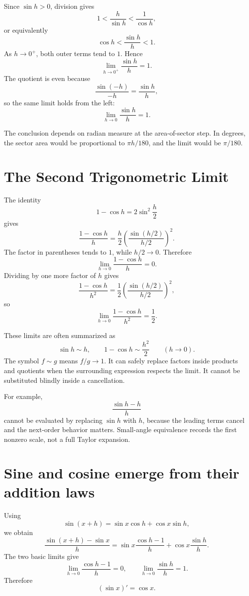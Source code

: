 Since \(\sin h>0\), division gives
\[
  1<\frac{h}{\sin h}<\frac1{\cos h},
\]
or equivalently
\[
  \cos h<\frac{\sin h}{h}<1.
\]
As \(h\to0^+\), both outer terms tend to \(1\).  Hence
\[
  \lim_{h\to0^+}\frac{\sin h}{h}=1.
\]
The quotient is even because
\[
  \frac{\sin(-h)}{-h}=\frac{\sin h}{h},
\]
so the same limit holds from the left:
\[
  \boxed{\displaystyle
  \lim_{h\to0}\frac{\sin h}{h}=1.}
\]

The conclusion depends on radian measure at the area-of-sector step.  In degrees, the sector area would be proportional to \(\pi h/180\), and the limit would be \(\pi/180\).

\section{The Second Trigonometric Limit}

The identity
\[
  1-\cos h=2\sin^2\frac h2
\]
gives
\[
  \frac{1-\cos h}{h}
  =\frac h2
   \left(
     \frac{\sin(h/2)}{h/2}
   \right)^2.
\]
The factor in parentheses tends to \(1\), while \(h/2\to0\).  Therefore
\[
  \boxed{\displaystyle
  \lim_{h\to0}\frac{1-\cos h}{h}=0.}
\]
Dividing by one more factor of \(h\) gives
\[
  \frac{1-\cos h}{h^2}
  =\frac12
   \left(
     \frac{\sin(h/2)}{h/2}
   \right)^2,
\]
so
\[
  \boxed{\displaystyle
  \lim_{h\to0}\frac{1-\cos h}{h^2}=\frac12.}
\]

These limits are often summarized as
\[
  \sin h\sim h,
  \qquad
  1-\cos h\sim\frac{h^2}{2}
  \qquad(h\to0).
\]
The symbol \(f\sim g\) means \(f/g\to1\).  It can safely replace factors inside products and quotients when the surrounding expression respects the limit.  It cannot be substituted blindly inside a cancellation.

For example,
\[
  \frac{\sin h-h}{h}
\]
cannot be evaluated by replacing \(\sin h\) with \(h\), because the leading terms cancel and the next-order behavior matters.  Small-angle equivalence records the first nonzero scale, not a full Taylor expansion.

\section{Sine and cosine emerge from their addition laws}

Using
\[
  \sin(x+h)=\sin x\cos h+\cos x\sin h,
\]
we obtain
\[
  \frac{\sin(x+h)-\sin x}{h}
  =\sin x\frac{\cos h-1}{h}
   +\cos x\frac{\sin h}{h}.
\]
The two basic limits give
\[
  \lim_{h\to0}\frac{\cos h-1}{h}=0,
  \qquad
  \lim_{h\to0}\frac{\sin h}{h}=1.
\]
Therefore
\[
  \boxed{(\sin x)'=\cos x.}
\]

